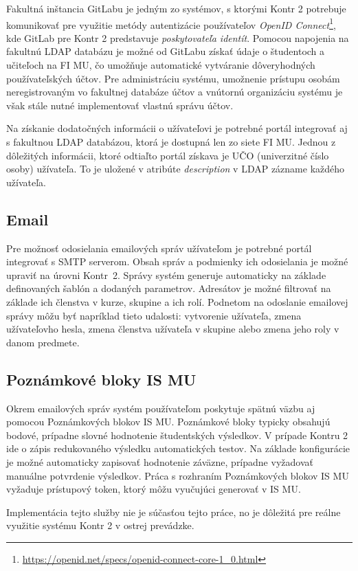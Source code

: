 \documentclass[
  digital, %
  twoside, %
  table,   %
  lof,     %
  lot,     %
]{fithesis3}
\begin{document}
Fakultná inštancia GitLabu je jedným zo systémov, s ktorými Kontr 2 potrebuje komunikovať pre využitie metódy autentizácie používateľov \emph{OpenID Connect}\footnote{\url{https://openid.net/specs/openid-connect-core-1_0.html}}, kde GitLab pre Kontr 2 predstavuje \emph{poskytovateľa identít}. Pomocou napojenia na fakultnú LDAP databázu je možné od GitLabu získať údaje o študentoch a učiteľoch na FI MU, čo umožňuje automatické vytváranie dôveryhodných používateľských účtov. Pre administráciu systému, umožnenie prístupu osobám neregistrovaným vo fakultnej databáze účtov a vnútornú organizáciu systému je však stále nutné implementovať vlastnú správu účtov. 

Na získanie dodatočných informácii o užívateľovi je potrebné portál integrovať aj s fakultnou LDAP databázou, ktorá je dostupná len zo siete FI MU. Jednou z dôležitých informácii, ktoré odtiaľto portál získava je UČO (univerzitné číslo osoby) užívateľa. To je uložené v atribúte \emph{description} v LDAP zázname každého užívateľa.

\subsection{Email}
Pre možnosť odosielania emailových správ užívateľom je potrebné portál integrovať s SMTP serverom. Obsah správ a podmienky ich odosielania je možné upraviť na úrovni Kontr~2. Správy systém generuje automaticky na základe definovaných šablón a dodaných parametrov. Adresátov je možné filtrovať na základe ich členstva v kurze, skupine a ich rolí. Podnetom na odoslanie emailovej správy môžu byť napríklad tieto udalosti: vytvorenie užívateľa, zmena užívateľovho hesla, zmena členstva užívateľa v skupine alebo zmena jeho roly v danom predmete.

\subsection{Poznámkové bloky IS MU}
Okrem emailových správ systém používateľom poskytuje spätnú väzbu aj pomocou Poznámkových blokov IS MU. Poznámkové bloky typicky obsahujú bodové, prípadne slovné hodnotenie študentských výsledkov. V prípade Kontru 2 ide o zápis redukovaného výsledku automatických testov. Na základe konfigurácie je možné automaticky zapisovať hodnotenie záväzne, prípadne vyžadovať manuálne potvrdenie výsledkov. Práca s rozhraním Poznámkových blokov IS MU vyžaduje prístupový token, ktorý môžu vyučujúci generovať v IS MU.

Implementácia tejto služby nie je súčasťou tejto práce, no je dôležitá pre reálne využitie systému Kontr 2 v ostrej prevádzke.
\end{document}
